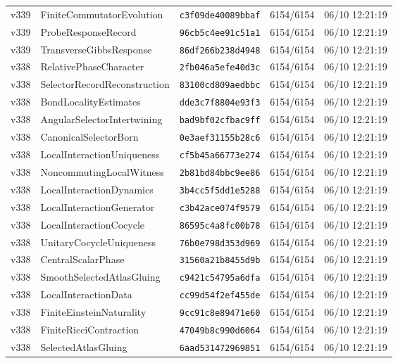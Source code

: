 \documentclass[11pt]{article}
\theoremstyle{definition}\newtheorem{deriv}{Derivation}
\begin{document}
{\begin{longtable}{@{}lllll@{}}
v339 & FiniteCommutatorEvolution & \texttt{c3f09de40089bbaf} & 6154/6154 & 06/10 12:21:19 \\
v339 & ProbeResponseRecord & \texttt{96cb5c4ee91c51a1} & 6154/6154 & 06/10 12:21:19 \\
v339 & TransverseGibbsResponse & \texttt{86df266b238d4948} & 6154/6154 & 06/10 12:21:19 \\
v338 & RelativePhaseCharacter & \texttt{2fb046a5efe40d3c} & 6154/6154 & 06/10 12:21:19 \\
v338 & SelectorRecordReconstruction & \texttt{83100cd809aedbbc} & 6154/6154 & 06/10 12:21:19 \\
v338 & BondLocalityEstimates & \texttt{dde3c7f8804e93f3} & 6154/6154 & 06/10 12:21:19 \\
v338 & AngularSelectorIntertwining & \texttt{bad9bf02cfbac9ff} & 6154/6154 & 06/10 12:21:19 \\
v338 & CanonicalSelectorBorn & \texttt{0e3aef31155b28c6} & 6154/6154 & 06/10 12:21:19 \\
v338 & LocalInteractionUniqueness & \texttt{cf5b45a66773e274} & 6154/6154 & 06/10 12:21:19 \\
v338 & NoncommutingLocalWitness & \texttt{2b81bd84bbc9ee86} & 6154/6154 & 06/10 12:21:19 \\
v338 & LocalInteractionDynamics & \texttt{3b4cc5f5dd1e5288} & 6154/6154 & 06/10 12:21:19 \\
v338 & LocalInteractionGenerator & \texttt{c3b42ace074f9579} & 6154/6154 & 06/10 12:21:19 \\
v338 & LocalInteractionCocycle & \texttt{86595c4a8fc00b78} & 6154/6154 & 06/10 12:21:19 \\
v338 & UnitaryCocycleUniqueness & \texttt{76b0e798d353d969} & 6154/6154 & 06/10 12:21:19 \\
v338 & CentralScalarPhase & \texttt{31560a21b8455d9b} & 6154/6154 & 06/10 12:21:19 \\
v338 & SmoothSelectedAtlasGluing & \texttt{c9421c54795a6dfa} & 6154/6154 & 06/10 12:21:19 \\
v338 & LocalInteractionData & \texttt{cc99d54f2ef455de} & 6154/6154 & 06/10 12:21:19 \\
v338 & FiniteEinsteinNaturality & \texttt{9cc91c8e89471e60} & 6154/6154 & 06/10 12:21:19 \\
v338 & FiniteRicciContraction & \texttt{47049b8c990d6064} & 6154/6154 & 06/10 12:21:19 \\
v338 & SelectedAtlasGluing & \texttt{6aad531472969851} & 6154/6154 & 06/10 12:21:19 \\

\end{longtable}}
\end{document}
